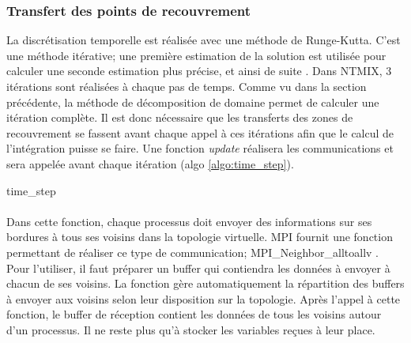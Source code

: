 \subsubsection{Transfert des points de recouvrement}

La discrétisation temporelle est réalisée avec une méthode de Runge-Kutta. C'est une méthode itérative; une première estimation de la solution est utilisée pour calculer une seconde estimation plus précise, et ainsi de suite \cite{Hirsch:1988:NCI:63653}. Dans NTMIX, 3 itérations sont réalisées à chaque pas de temps.
Comme vu dans la section précédente, la méthode de décomposition de domaine permet de calculer une itération complète. Il est donc nécessaire que les transferts des zones de recouvrement se fassent avant chaque appel à ces itérations afin que le calcul de l'intégration puisse se faire. Une fonction \textit{update} réalisera les communications et sera appelée avant chaque itération (algo \ref{algo:time_step}).


\begin{algorithm}
  \caption{time\_step}
  \label{algo:time_step}
  \begin{algorithmic}
  \end{algorithmic}
\end{algorithm}



\paragraph{}Dans cette fonction, chaque processus doit envoyer des informations sur ses bordures à tous ses voisins dans la topologie virtuelle. MPI fournit une fonction permettant de réaliser ce type de communication; MPI\_Neighbor\_alltoallv \cite{mpi-3.0}. Pour l'utiliser, il faut préparer un buffer qui contiendra les données à envoyer à chacun de ses voisins. La fonction gère automatiquement la répartition des buffers à envoyer aux voisins selon leur disposition sur la topologie. Après l'appel à cette fonction, le buffer de réception contient les données de tous les voisins autour d'un processus. Il ne reste plus qu'à stocker les variables reçues à leur place. 


